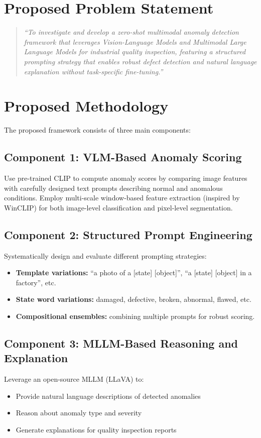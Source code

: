 \documentclass[12pt, a4paper]{article}
\begin{document}
\section{Proposed Problem Statement}

\begin{quote}
\textit{``To investigate and develop a zero-shot multimodal anomaly detection framework that leverages Vision-Language Models and Multimodal Large Language Models for industrial quality inspection, featuring a structured prompting strategy that enables robust defect detection and natural language explanation without task-specific fine-tuning.''}
\end{quote}

\section{Proposed Methodology}

The proposed framework consists of three main components:

\subsection{Component 1: VLM-Based Anomaly Scoring}
Use pre-trained CLIP to compute anomaly scores by comparing image features with carefully designed text prompts describing normal and anomalous conditions. Employ multi-scale window-based feature extraction (inspired by WinCLIP) for both image-level classification and pixel-level segmentation.

\subsection{Component 2: Structured Prompt Engineering}
Systematically design and evaluate different prompting strategies:
\begin{itemize}
    \item \textbf{Template variations:} ``a photo of a [state] [object]'', ``a [state] [object] in a factory'', etc.
    \item \textbf{State word variations:} damaged, defective, broken, abnormal, flawed, etc.
    \item \textbf{Compositional ensembles:} combining multiple prompts for robust scoring.
\end{itemize}

\subsection{Component 3: MLLM-Based Reasoning and Explanation}
Leverage an open-source MLLM (LLaVA) to:
\begin{itemize}
    \item Provide natural language descriptions of detected anomalies
    \item Reason about anomaly type and severity
    \item Generate explanations for quality inspection reports
\end{itemize}
\end{document}

